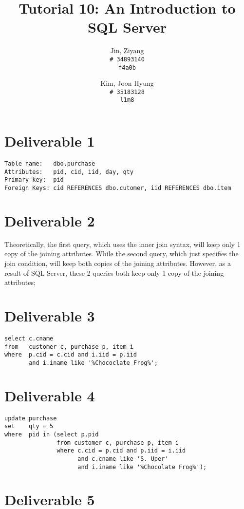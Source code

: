 \documentclass{article}
\title{Tutorial 10: An Introduction to SQL Server}
\author{
	Jin, Ziyang\\
	\texttt{\# 34893140}\\
	\texttt{f4a0b}
	\and
	Kim, Joon Hyung\\
	\texttt{\# 35183128}\\
	\texttt{l1m8}
}
\begin{document}
	\maketitle

\section{Deliverable 1}

\begin{verbatim}
Table name:   dbo.purchase
Attributes:   pid, cid, iid, day, qty
Primary key:  pid
Foreign Keys: cid REFERENCES dbo.cutomer, iid REFERENCES dbo.item
\end{verbatim}

\section{Deliverable 2}

Theoretically, the first query, which uses the inner join syntax, will keep only 1 copy of the joining attributes. While the second query, which just specifies the join condition, will keep both copies of the joining attributes. However, as a result of SQL Server, these 2 queries both keep only 1 copy of the joining attributes;

\section{Deliverable 3}

\begin{verbatim}
select c.cname
from   customer c, purchase p, item i
where  p.cid = c.cid and i.iid = p.iid 
       and i.iname like '%Chococlate Frog%';
\end{verbatim}

\section{Deliverable 4}
\begin{verbatim}
update purchase
set    qty = 5
where  pid in (select p.pid
               from customer c, purchase p, item i
               where c.cid = p.cid and p.iid = i.iid
                     and c.cname like 'S. Uper'
                     and i.iname like '%Chocolate Frog%');
\end{verbatim}

\section{Deliverable 5}
\end{document}
